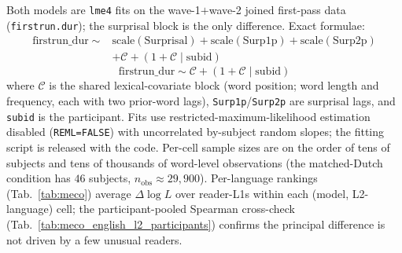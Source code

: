 Both models are \texttt{lme4} fits on the wave-1$+$wave-2 joined first-pass data (\texttt{firstrun.dur}); the surprisal block is the only difference. Exact formulae:
\begin{equation}
\label{eq:full-model}
\begin{split}
\mathrm{firstrun\_dur} \sim{}&
\mathrm{scale}(\mathrm{Surprisal})
+ \mathrm{scale}(\mathrm{Surp1p})
+ \mathrm{scale}(\mathrm{Surp2p}) \\
&+ \mathcal{C}
+ (1 + \mathcal{C} \mid \mathrm{subid})
\end{split}
\end{equation}
\begin{equation}
\label{eq:meco-spec}
\mathrm{firstrun\_dur} \sim
\mathcal{C}
+ (1 + \mathcal{C} \mid \mathrm{subid})
\end{equation}
where $\mathcal{C}$ is the shared lexical-covariate block (word position; word length and frequency, each with two prior-word lags), \texttt{Surp1p}/\texttt{Surp2p} are surprisal lags, and \texttt{subid} is the participant. Fits use restricted-maximum-likelihood estimation disabled (\texttt{REML=FALSE}) with uncorrelated by-subject random slopes; the fitting script is released with the code. Per-cell sample sizes are on the order of tens of subjects and tens of thousands of word-level observations (the matched-Dutch condition has $46$ subjects, $n_{\text{obs}}{\approx}29{,}900$). Per-language rankings (Tab.~\ref{tab:meco}) average $\Delta\log L$ over reader-L1s within each (model, L2-language) cell; the participant-pooled Spearman cross-check (Tab.~\ref{tab:meco_english_l2_participants}) confirms the principal difference is not driven by a few unusual readers.
 


